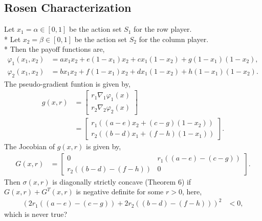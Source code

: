\documentclass{article}
\begin{document}
\subsection{Rosen Characterization}
Let $x_{1} = \alpha \in \left[0, 1\right]$ be the action set $S_{1}$ for the row player.
\\* Let $x_{2} = \beta \in \left[0, 1\right]$ be the action set $S_{2}$ for the column player.
\\* Then the payoff functions are,
\begin{align*}
\varphi_{1}\left(x_{1}, x_{2}\right) &= a x_{1} x_{2} + e \left(1 - x_{1}\right) x_{2} + c x_{1} \left(1 - x_{2}\right) + g \left(1 - x_{1}\right)\left(1 - x_{2}\right),
\\ \varphi_{2}\left(x_{1}, x_{2}\right) &= b x_{1} x_{2} + f \left(1 - x_{1}\right) x_{2} + d x_{1} \left(1 - x_{2}\right) + h \left(1 - x_{1}\right)\left(1 - x_{2}\right).
\end{align*}
The pseudo-gradient funtion is given by,
\begin{align*}
g\left(x, r\right)  &= \begin{bmatrix} r_{1} \nabla _{1} \varphi_{1}\left(x\right) \\ r_{2} \nabla _{2} \varphi_{2}\left(x\right) \end{bmatrix}
\\ &= \begin{bmatrix} r_{1} \left(\left(a - e\right) x_{2} + \left(c - g\right) \left(1 - x_{2}\right)\right) \\ r_{2} \left(\left(b - d\right) x_{1} + \left(f - h\right) \left(1 - x_{1}\right)\right) \end{bmatrix} .
\end{align*}
The Jocobian of $g\left(x, r \right) $ is given by,
\begin{align*}
G\left(x, r\right)  &= \begin{bmatrix} 0 & r_{1} \left(\left(a - e\right) - \left(c - g\right)\right) \\ r_{2} \left(\left(b - d\right) - \left(f - h\right)\right) & 0 \end{bmatrix} .
\end{align*}
Then $\sigma\left(x, r \right)$ is diagonally strictly concave (Theorem $6$) if $G\left(x, r\right)  + G^{T}\left(x, r \right)$ is negative definite for some $r  > 0$, here,
\begin{align*}
\left(2 r_{1} \left(\left(a - e\right) - \left(c - g\right)\right) + 2 r_{2} \left(\left(b - d\right) - \left(f - h\right)\right)\right)^{2} &< 0,
\end{align*}
which is never true?
\newline \newline
\end{document}
